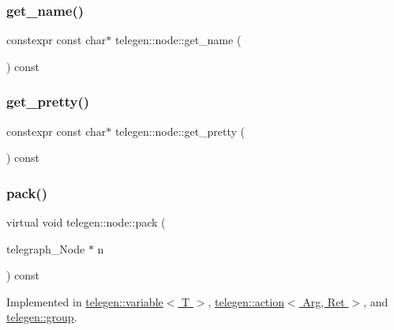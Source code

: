\mbox{\label{classtelegen_1_1node_afc6c76d81436f9040668324ed2d65ce4}} 
\subsubsection{\texorpdfstring{get\+\_\+name()}{get\_name()}}
{\footnotesize\ttfamily constexpr const char$\ast$ telegen\+::node\+::get\+\_\+name (\begin{DoxyParamCaption}{ }\end{DoxyParamCaption}) const\hspace{0.3cm}{\ttfamily [inline]}}

\mbox{\label{classtelegen_1_1node_aa92b0c42b744508c2b39bc047051a3ec}} 
\subsubsection{\texorpdfstring{get\+\_\+pretty()}{get\_pretty()}}
{\footnotesize\ttfamily constexpr const char$\ast$ telegen\+::node\+::get\+\_\+pretty (\begin{DoxyParamCaption}{ }\end{DoxyParamCaption}) const\hspace{0.3cm}{\ttfamily [inline]}}

\mbox{\label{classtelegen_1_1node_a8b6169d62f6e7c2e301435e52442fed3}} 
\subsubsection{\texorpdfstring{pack()}{pack()}}
{\footnotesize\ttfamily virtual void telegen\+::node\+::pack (\begin{DoxyParamCaption}\item[{telegraph\+\_\+\+Node $\ast$}]{n }\end{DoxyParamCaption}) const\hspace{0.3cm}{\ttfamily [pure virtual]}}



Implemented in \hyperlink{classtelegen_1_1variable_a8a077a32a045a67f049737517be3ea51}{telegen\+::variable$<$ T $>$}, \hyperlink{classtelegen_1_1action_a0e5686b3bf433afab1b0fda1002f95b0}{telegen\+::action$<$ Arg, Ret $>$}, and \hyperlink{classtelegen_1_1group_ae146155bf745b0b3d39e3244c3ebb26d}{telegen\+::group}.

